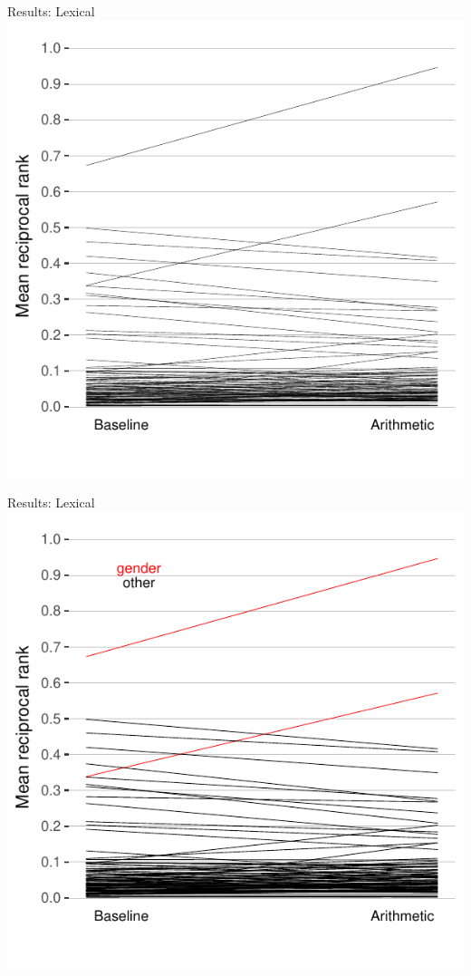 \documentclass{beamer}
\begin{document}
\begin{frame}{Results: Lexical}
\centering
\includegraphics[scale=.8]{lexical.pdf}
\end{frame}
\begin{frame}{Results: Lexical}
\centering
\includegraphics[scale=.8]{lexical2.pdf}
\end{frame}
\end{document}
